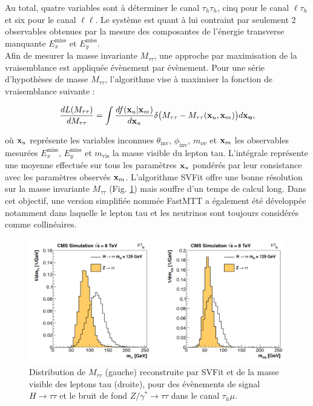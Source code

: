 Au total, quatre variables sont à déterminer le canal $\tau_h\tau_h$, cinq pour le canal $\ell\tau_h$ et six pour le canal $\ell\ell$. Le système est quant à lui contraint par seulement 2 observables obtenues par la mesure des composantes de l'énergie transverse manquante $E_x^{\text{miss}}$ et $E_y^{\text{miss}}$. \\

Afin de mesurer la masse invariante $M_{\tau\tau}$, une approche par maximisation de la vraisemblance est appliquée évènement par évènement. Pour une série d'hypothèses de masse $M_{\tau\tau}$, l'algorithme vise à maximiser la fonction de vraisemblance suivante :

\begin{equation}
    \frac{dL(M_{\tau\tau})}{dM_{\tau\tau}}=\int \frac{df(\vb{x}_u|\vb{x}_m)}{d\vb{x}_u}\delta\bigl(M_{\tau\tau}-M_{\tau\tau}(\vb{x}_u,\vb{x}_m)\bigr)d\vb{x_u},
\end{equation}

où $\vb{x}_u$ représente les variables inconnues $\theta_{\text{inv}}$, $\phi_{\text{inv}}$, $m_{\nu\nu}$ et $\vb{x}_m$ les observables mesurées $E_x^{\text{miss}}$, $E_y^{\text{miss}}$ et $m_{\text{vis}}$ la masse visible du lepton tau. L'intégrale représente une moyenne effectuée sur tous les paramètres $\vb{x}_u$ pondérés par leur consistance avec les paramètres observés $\vb{x}_m$. L'algorithme SVFit offre une bonne résolution sur la masse invariante $M_{\tau\tau}$ (Fig. \ref{SVFitres}) mais souffre d'un temps de calcul long. Dans cet objectif, une version simplifiée nommée FastMTT a également été développée notamment dans laquelle le lepton tau et les neutrinos sont toujours considérés comme collinéaires.

\begin{figure}
\centering
    \includegraphics[scale=0.3]{Chapitre6/Images/SVFitres.png} 
    \caption{Distribution de $M_{\tau\tau}$ (gauche) reconstruite par SVFit et de la masse visible des leptons tau (droite), pour des évènements de signal $H\rightarrow\tau\tau$ et le bruit de fond $Z/\gamma^*\rightarrow\tau\tau$ dans le canal $\tau_h\mu$. \cite{SVFit}}
    \label{SVFitres}
\end{figure}

